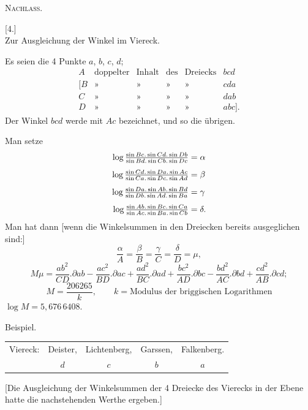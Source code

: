 \clearpage
{}\hfill\textsc{Nachlass.}\hfill\mbox{}\par\medskip
\begin{center}[4.]\\[5pt]Zur Ausgleichung der Winkel im Viereck.\end{center}
Es seien die 4 Punkte $a$, $b$, $c$, $d$;
\[
\begin{array}{rlllll}
A&\text{doppelter}&\text{Inhalt}&\text{des}&\text{Dreiecks}&bcd\\
{[}B&\text{»}&\text{»}&\text{»}&\text{»}&cda\\
C&\text{»}&\text{»}&\text{»}&\text{»}&dab\\
D&\text{»}&\text{»}&\text{»}&\text{»}&abc].
\end{array}
\]
Der Winkel $bcd$ werde mit $Ac$ bezeichnet, und so die übrigen.

Man setze
\[
\begin{aligned}
\log\tfrac{\sin Bc.\sin Cd.\sin Db}{\sin Bd.\sin Cb.\sin Dc}&=\alpha\\[4pt]
\log\tfrac{\sin Cd.\sin Da.\sin Ac}{\sin Ca.\sin Dc.\sin Ad}&=\beta\\[4pt]
\log\tfrac{\sin Da.\sin Ab.\sin Bd}{\sin Db.\sin Ad.\sin Ba}&=\gamma\\[4pt]
\llap{\raisebox{-.5ex}{\text{\tiny.}}\hspace{3.5cm}}\log\tfrac{\sin Ab.\sin Bc.\sin Ca}{\sin Ac.\sin Ba.\sin Cb}&=\delta.
\end{aligned}
\]
Man hat dann [wenn die Winkelsummen in den Dreiecken bereits ausgeglichen sind:]
\[
\frac\alpha A=\frac\beta B=\frac\gamma C=\frac\delta D=\mu,
\]
\[
M\mu=\frac{ab^2}{CD}.\partial ab-\frac{ac^2}{BD}.\partial ac+\frac{ad^2}{BC}.\partial ad+\frac{bc^2}{AD}.\partial bc-\frac{bd^2}{AC}.\partial bd+\frac{cd^2}{AB}.\partial cd;
\]
\[
M=\frac{206265}{k},\qquad k=\text{Modulus der briggischen Logarithmen}
\]
\noindent\hspace*{.7cm}$\log M=5{,}676\,6408$.
\begin{center}Beispiel.\end{center}
\begin{center}
\begin{tabular}{rcccc}
Viereck:&Deister,&Lichtenberg,&Garssen,&Falkenberg.\\
&$d$&$c$&$b$&$a$
\end{tabular}
\end{center}
[Die Ausgleichung der Winkelsummen der 4 Dreiecke des Vierecks in der Ebene hatte die nachstehenden Werthe ergeben.]

